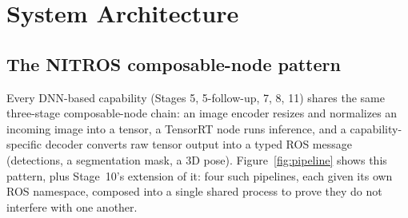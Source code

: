 \documentclass[11pt,a4paper]{article}
\begin{document}
\section{System Architecture}

\subsection{The NITROS composable-node pattern}

Every DNN-based capability (Stages 5, 5-follow-up, 7, 8, 11) shares the
same three-stage composable-node chain: an image encoder resizes and
normalizes an incoming image into a tensor, a TensorRT node runs
inference, and a capability-specific decoder converts raw tensor output
into a typed ROS message (detections, a segmentation mask, a 3D pose).
Figure~\ref{fig:pipeline} shows this pattern, plus Stage~10's extension
of it: four such pipelines, each given its own ROS namespace, composed
into a single shared process to prove they do not interfere with one
another.
\end{document}
